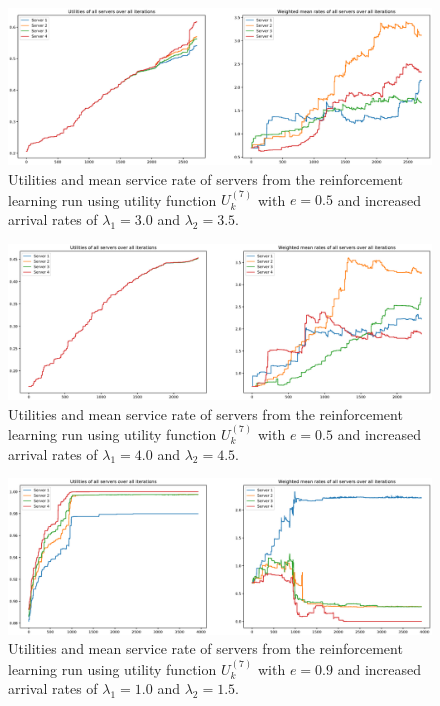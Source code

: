 \begin{figure}[H]
    \includegraphics[width=\textwidth]{chapters/00_appendix/03_more_rl_results/Bin/utility_7_eps/u7_4_e05_Lambda_65.eps}
    \caption{Utilities and mean service rate of servers from the reinforcement
    learning run using utility function \(U_k^{(7)}\) with \(e = 0.5\) and
    increased arrival rates of \(\lambda_1 = 3.0\) and \(\lambda_2 = 3.5\).}
    \label{fig:RL_utility7_4_e05_Lambda_65}
\end{figure}


\begin{figure}[H]
    \includegraphics[width=\textwidth]{chapters/00_appendix/03_more_rl_results/Bin/utility_7_eps/u7_4_e05_Lambda_85.eps}
    \caption{Utilities and mean service rate of servers from the reinforcement
    learning run using utility function \(U_k^{(7)}\) with \(e = 0.5\) and
    increased arrival rates of \(\lambda_1 = 4.0\) and \(\lambda_2 = 4.5\).}
    \label{fig:RL_utility7_4_e05_Lambda_85}
\end{figure}


\begin{figure}[H]
    \includegraphics[width=\textwidth]{chapters/00_appendix/03_more_rl_results/Bin/utility_7_eps/u7_4_e09_Lambda_25.eps}
    \caption{Utilities and mean service rate of servers from the reinforcement
    learning run using utility function \(U_k^{(7)}\) with \(e = 0.9\) and
    increased arrival rates of \(\lambda_1 = 1.0\) and \(\lambda_2 = 1.5\).}
    \label{fig:RL_utility7_4_e09_Lambda_25}
\end{figure}


